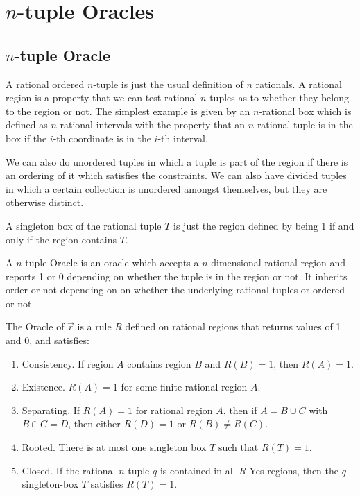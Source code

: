 \documentclass[12pt]{article}
\theoremstyle{remark}
\begin{document}
\section{$n$-tuple Oracles}

\subsection{$n$-tuple Oracle}

A rational ordered $n$-tuple is just the usual definition of $n$ rationals. A rational region is a property that we can test rational $n$-tuples as to whether they belong to the region or not. The simplest example is given by an $n$-rational box which is defined as $n$ rational intervals with the property that an $n$-rational tuple is in the box if the $i$-th coordinate is in the $i$-th interval. 

We can also do unordered tuples in which a tuple is part of the region if there is an ordering of it which satisfies the constraints. We can also have divided tuples in which a certain collection is unordered amongst themselves, but they are otherwise distinct. 

A singleton box of the rational tuple $T$ is just the region defined by being 1 if and only if the region contains $T$.

A $n$-tuple Oracle is an oracle which accepts a $n$-dimensional rational region and reports 1 or 0 depending on whether the tuple is in the region or not. It inherits order or not depending on on whether the underlying rational tuples or ordered or not. 

The Oracle of $\Vec{r}$ is a rule $R$ defined on rational regions that returns values of 1 and 0, and satisfies: 
\begin{enumerate}
    \item Consistency. If region $A$ contains region $B$ and $R(B) = 1$, then $R(A) = 1$.
    \item Existence. $R(A) = 1$ for some finite rational region $A$.
    \item Separating. If $R(A)=1$ for rational region $A$, then if $A = B \cup C$ with $B \cap C = D$, then either $R(D) = 1$ or $R(B) \neq R(C)$. 
    \item Rooted. There is at most one singleton box $T$ such that $R(T) =1$.
    \item Closed. If the rational $n$-tuple $q$ is contained in all $R$-Yes regions, then the $q$ singleton-box $T$ satisfies $R(T) = 1$.
\end{enumerate}
\end{document}
